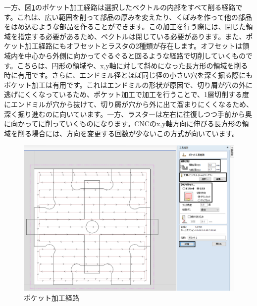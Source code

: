 \documentclass[b5paper, 9pt, twocolumn, titlepage,openany]{jsbook}%
\begin{document}

\clearpage
一方、図\ref{pocket_milling}のポケット加工経路は選択したベクトルの内部をすべて削る経路です。これは、広い範囲を削って部品の厚みを変えたり、くぼみを作って他の部品をはめ込むような部品を作ることができます。この加工を行う際には、閉じた領域を指定する必要があるため、ベクトルは閉じている必要があります。また、ポケット加工経路にもオフセットとラスタの2種類が存在します。オフセットは領域内を中心から外側に向かってぐるぐると回るような経路で切削していくものです。こちらは、円形の領域や、x,y軸に対して斜めになった長方形の領域を削る時に有用です。さらに、エンドミル径とほぼ同じ径の小さい穴を深く掘る際にもポケット加工は有用です。これはエンドミルの形状が原因で、切り屑が穴の外に逃げにくくなっているため、ポケット加工で加工を行うことで、1層切削する度にエンドミルが穴から抜けて、切り屑が穴から外に出て溜まりにくくなるため、深く掘り進むのに向いています。一方、ラスターは左右に往復しつつ手前から奥に向かってに削っていくものになります。CNCのx,y軸方向に伸びる長方形の領域を削る場合には、方向を変更する回数が少ないこの方式が向いています。\\

\begin{figure}[tbh]
  \begin{center}
    \begin{minipage}{1.0\columnwidth}
      \includegraphics[width=\columnwidth]{pocket_milling_trim.png}
    \end{minipage}
    \caption{ポケット加工経路\label{pocket_milling}}
  \end{center}
\end{figure}
\end{document}
